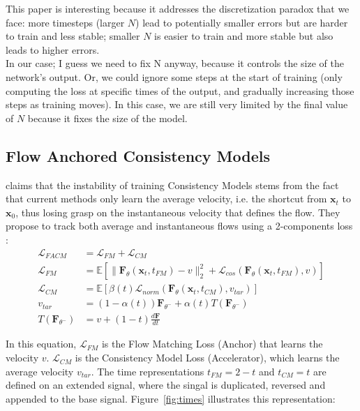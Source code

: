 \noindent This paper is interesting because it addresses the discretization paradox that we face: more timesteps (larger $N$) lead to potentially smaller errors but are harder to train and less stable; smaller $N$ is easier to train and more stable but also leads to higher errors. \\

\noindent In our case; I guess we need to fix N anyway, because it controls the size of the network's output. Or, we could ignore some steps at the start of training (only computing the loss at specific times of the output, and gradually increasing those steps as training moves). In this case, we are still very limited by the final value of $N$ because it fixes the size of the model.

\subsection{Flow Anchored Consistency Models}

\cite{peng2025flowanchoredconsistencymodels} claims that the instability of training Consistency Models stems from the fact that current methods only learn the average velocity, i.e. the shortcut from $\mathbf{x}_t$ to $\mathbf{x}_0$, thus losing grasp on the instantaneous velocity that defines the flow. They propose to track both average and instantaneous flows using a 2-components loss : 
\begin{align*}
    \mathcal{L}_{FACM} & = \mathcal{L}_{FM} + \mathcal{L}_{CM} \\
    \mathcal{L}_{FM} & = \mathbb{E} \left[ \lVert \mathbf{F}_{\theta}(\mathbf{x}_t, t_{FM}) - v \rVert^{2}_2 + \mathcal{L}_{cos}(\mathbf{F}_{\theta}(\mathbf{x}_t, t_{FM}), v)\right] \\
    \mathcal{L}_{CM} &= \mathbb{E} \left[ \beta(t) \mathcal{L}_{norm}(\mathbf{F}_{\theta}(\mathbf{x}_t, t_{CM}), v_{tar}) \right] \\
    v_{tar} &= (1 - \alpha(t))\mathbf{F}_{\theta^{-}} + \alpha(t)T(\mathbf{F}_{\theta^{-}}) \\
    T(\mathbf{F}_{\theta^{-}}) &= v + (1 - t) \frac{d\mathbf{F}}{dt}
\end{align*}

\noindent In this equation, $\mathcal{L}_{FM}$ is the Flow Matching Loss (Anchor) that learns the velocity $v$. $\mathcal{L}_{CM}$ is the Consistency Model Loss (Accelerator), which learns the average velocity $v_{tar}$. The time representations $t_{FM} = 2 - t$ and $t_{CM} = t$ are defined on an extended signal, where the singal is duplicated, reversed and appended to the base signal. Figure~\ref{fig:times} illustrates this representation:

